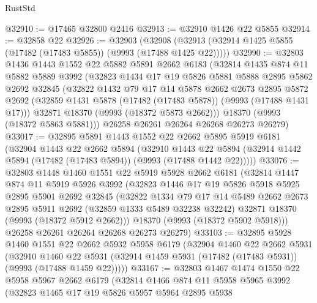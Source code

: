 \begin{lexlean}{RustStd}
\begin{coremodule}
@32910 := @17465 @32800 @2416
@32913 := @32910 @1426 @22 @5855
@32914 := @32858 @22
@32926 := @32903
    (@32908 (@32913 (@32914 @1425 @5855 (@17482 (@17483 @5855)) (@9993 (@17488 @1425 @22)))))
@32990 := @32803
    @1436
    @1443
    @1552
    @22
    @5882
    @5891
    @2662
    @6183
    (@32814
      @1435
      @874
      @11
      @5882
      @5889
      @3992
      (@32823
        @1434
        @17
        @19
        @5826
        @5881
        @5888
        @2895
        @5862
        @2692
        @32845
        (@32822
          @1432
          @79
          @17
          @14
          @5878
          @2662
          @2673
          @2895
          @5872
          @2692
          (@32859 @1431 @5878 (@17482 (@17483 @5878)) (@9993 (@17488 @1431 @17)))
          @32871
          @18370
          (@9993 (@18372 @5873 @2662)))
        @18370
        (@9993 (@18372 @5863 @5881)))
      @26258
      @26261
      @26264
      @26268
      @26273
      @26279)
@33017 := @32895
    @5891
    @1443
    @1552
    @22
    @2662
    @5895
    @5919
    @6181
    (@32904
      @1443
      @22
      @2662
      @5894
      (@32910
        @1443
        @22
        @5894
        (@32914 @1442 @5894 (@17482 (@17483 @5894)) (@9993 (@17488 @1442 @22)))))
@33076 := @32803
    @1448
    @1460
    @1551
    @22
    @5919
    @5928
    @2662
    @6181
    (@32814
      @1447
      @874
      @11
      @5919
      @5926
      @3992
      (@32823
        @1446
        @17
        @19
        @5826
        @5918
        @5925
        @2895
        @5901
        @2692
        @32845
        (@32822
          @1334
          @79
          @17
          @14
          @5489
          @2662
          @2673
          @2895
          @5911
          @2692
          (@32859 @1333 @5489 @32238 @32242)
          @32871
          @18370
          (@9993 (@18372 @5912 @2662)))
        @18370
        (@9993 (@18372 @5902 @5918)))
      @26258
      @26261
      @26264
      @26268
      @26273
      @26279)
@33103 := @32895
    @5928
    @1460
    @1551
    @22
    @2662
    @5932
    @5958
    @6179
    (@32904
      @1460
      @22
      @2662
      @5931
      (@32910
        @1460
        @22
        @5931
        (@32914 @1459 @5931 (@17482 (@17483 @5931)) (@9993 (@17488 @1459 @22)))))
@33167 := @32803
    @1467
    @1474
    @1550
    @22
    @5958
    @5967
    @2662
    @6179
    (@32814
      @1466
      @874
      @11
      @5958
      @5965
      @3992
      (@32823
        @1465
        @17
        @19
        @5826
        @5957
        @5964
        @2895
        @5938

\end{coremodule}
\end{lexlean}

